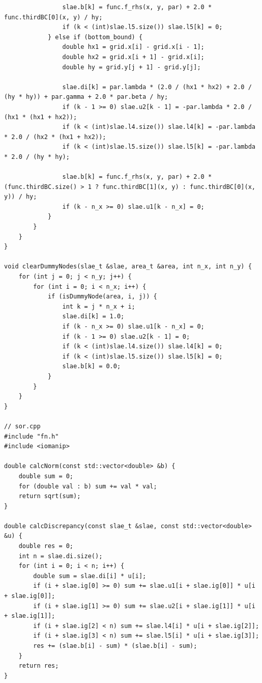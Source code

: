 \documentclass[a4paper,12pt]{article}
\begin{document}
\begin{lstlisting}
                slae.b[k] = func.f_rhs(x, y, par) + 2.0 * func.thirdBC[0](x, y) / hy;
                if (k < (int)slae.l5.size()) slae.l5[k] = 0;
            } else if (bottom_bound) {
                double hx1 = grid.x[i] - grid.x[i - 1];
                double hx2 = grid.x[i + 1] - grid.x[i];
                double hy = grid.y[j + 1] - grid.y[j];
                
                slae.di[k] = par.lambda * (2.0 / (hx1 * hx2) + 2.0 / (hy * hy)) + par.gamma + 2.0 * par.beta / hy;
                if (k - 1 >= 0) slae.u2[k - 1] = -par.lambda * 2.0 / (hx1 * (hx1 + hx2));
                if (k < (int)slae.l4.size()) slae.l4[k] = -par.lambda * 2.0 / (hx2 * (hx1 + hx2));
                if (k < (int)slae.l5.size()) slae.l5[k] = -par.lambda * 2.0 / (hy * hy);
                
                slae.b[k] = func.f_rhs(x, y, par) + 2.0 * (func.thirdBC.size() > 1 ? func.thirdBC[1](x, y) : func.thirdBC[0](x, y)) / hy;
                if (k - n_x >= 0) slae.u1[k - n_x] = 0;
            }
        }
    }
}

void clearDummyNodes(slae_t &slae, area_t &area, int n_x, int n_y) {
    for (int j = 0; j < n_y; j++) {
        for (int i = 0; i < n_x; i++) {
            if (isDummyNode(area, i, j)) {
                int k = j * n_x + i;
                slae.di[k] = 1.0;
                if (k - n_x >= 0) slae.u1[k - n_x] = 0;
                if (k - 1 >= 0) slae.u2[k - 1] = 0;
                if (k < (int)slae.l4.size()) slae.l4[k] = 0;
                if (k < (int)slae.l5.size()) slae.l5[k] = 0;
                slae.b[k] = 0.0;
            }
        }
    }
}

// sor.cpp
#include "fn.h"
#include <iomanip>

double calcNorm(const std::vector<double> &b) {
    double sum = 0;
    for (double val : b) sum += val * val;
    return sqrt(sum);
}

double calcDiscrepancy(const slae_t &slae, const std::vector<double> &u) {
    double res = 0;
    int n = slae.di.size();
    for (int i = 0; i < n; i++) {
        double sum = slae.di[i] * u[i];
        if (i + slae.ig[0] >= 0) sum += slae.u1[i + slae.ig[0]] * u[i + slae.ig[0]];
        if (i + slae.ig[1] >= 0) sum += slae.u2[i + slae.ig[1]] * u[i + slae.ig[1]];
        if (i + slae.ig[2] < n) sum += slae.l4[i] * u[i + slae.ig[2]];
        if (i + slae.ig[3] < n) sum += slae.l5[i] * u[i + slae.ig[3]];
        res += (slae.b[i] - sum) * (slae.b[i] - sum);
    }
    return res;
}


\end{lstlisting}
\end{document}

